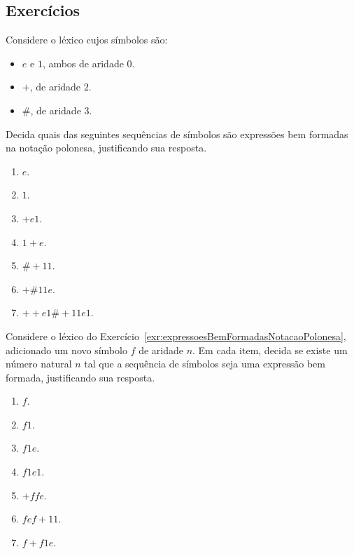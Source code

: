 \subsection*{Exercícios}
\begin{exercise}\label{exr:expressoesBemFormadasNotacaoPolonesa}
    Considere o léxico cujos símbolos são:
    \begin{itemize}
        \item $e$ e $1$, ambos de aridade $0$.
        \item $+$, de aridade $2$.
        \item $\#$, de aridade $3$.
    \end{itemize}
    Decida quais das seguintes sequências de símbolos são expressões bem formadas na notação polonesa, justificando sua resposta.
\begin{enumerate}[label=(\alph*)]
    \item $e$.
    \item $1$.
    \item $+e1$.
    \item $1+e$.
    \item $\#+11$.
    \item $+\#11e$.
    \item $++e1\#+11e1$.
\end{enumerate}
\end{exercise}

\begin{exercise}\label{exr:aridadeDoNovoSimbolo}
    Considere o léxico do Exercício~\ref{exr:expressoesBemFormadasNotacaoPolonesa}, adicionado um novo símbolo $f$ de aridade $n$.
    Em cada item, decida se existe um número natural $n$ tal que a sequência de símbolos seja uma expressão bem formada, justificando sua resposta.
\begin{enumerate}[label=(\alph*)]
    \item $f$.
    \item $f1$.
    \item $f1e$.
    \item $f1e1$.
    \item $+ffe$.
    \item $fef+11$.
    \item $f+f1e$.
\end{enumerate}
\end{exercise}
